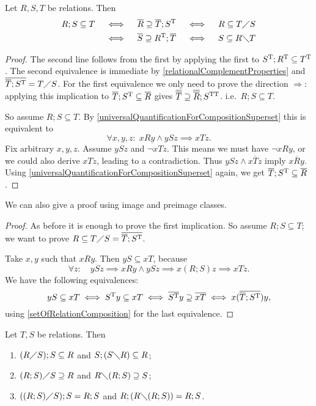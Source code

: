 \begin{proposition} \label{SchroderRule}
Let $R,S,T$ be relations. Then
\begin{align*}
R;S \subseteq T &\quad\iff\quad \overline{R} \supseteq \overline{T};S^{\mathrm{T}} \quad\iff\quad R \subseteq T\diagup S \\
&\quad\iff\quad \overline{S} \supseteq R^{\mathrm{T}} ; \overline{T} \quad\iff\quad S \subseteq R\diagdown T
\end{align*}
\end{proposition}
\begin{proof}
The second line follows from the first by applying the first to $S^{\mathrm{T}};R^{\mathrm{T}} \subseteq T^{\mathrm{T}}$. The second equivalence is immediate by \ref{relationalComplementProperties} and $\overline{\overline{T};S^{\mathrm{T}}} = T\diagup S$. For the first equivalence we only need to prove the direction $\Rightarrow$: applying this implication to $\overline{T};S^{\mathrm{T}} \subseteq \overline{R}$ gives $\overline{\overline{T}}\supseteq \overline{\overline{R}};S^{\mathrm{T}\mathrm{T}}$. i.e.\ $R;S \subseteq T$.

So assume $R;S \subseteq T$. By \ref{universalQuantificationForCompositionSuperset} this is equivalent to
\[ \forall x,y,z:\; xRy \land ySz \implies xTz. \]
Fix arbitrary $x,y,z$. Assume $ySz$ and $\neg xTz$. This means we must have $\neg xRy$, or we could also derive $xTz$, leading to a contradiction. Thus $ySz \land x\overline{T}z$ imply $x\overline{R}y$. Using \ref{universalQuantificationForCompositionSuperset} again, we get $\overline{T};S^{\mathrm{T}} \subseteq \overline{R}$.
\end{proof}
We can also give a proof using image and preimage classes.
\begin{proof}
As before it is enough to prove the first implication. So assume $R;S \subseteq T$; we want to prove $R \subseteq T\diagup S = \overline{\overline{T}; S^{\mathrm{T}}}$.

Take $x,y$ such that $xRy$. Then $yS \subseteq xT$, because
\[ \forall z: \quad ySz \implies xRy\land ySz \implies x(R;S)z \implies xTz. \]
We have the following equivalences:
\[ yS \subseteq xT \iff S^{\mathrm{T}} y \subseteq xT \iff \overline{S^{\mathrm{T}}}y \supseteq \overline{xT} \iff x(\overline{\overline{T}; S^{\mathrm{T}}})y, \]
using \ref{setOfRelationComposition} for the last equivalence.
\end{proof}
\begin{corollary} \label{GaloisConnectionFromSchroderRule}
Let $T,S$ be relations. Then
\begin{enumerate}
\item $(R\diagup S);S \subseteq R$ and $S;(S\diagdown R) \subseteq R$;
\item $(R;S)\diagup S \supseteq R$ and $R\diagdown (R;S) \supseteq S$;
\item $((R;S)\diagup S);S = R;S$ and $R;(R\diagdown(R;S)) = R;S$.
\end{enumerate}
\end{corollary}
